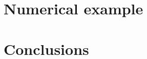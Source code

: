 \documentclass[journal,twoside,web]{ieeecolor}
\begin{document}
\section{Numerical example}\label{sec:example}

\section{Conclusions}\label{sec:conclusions}





\end{document}
